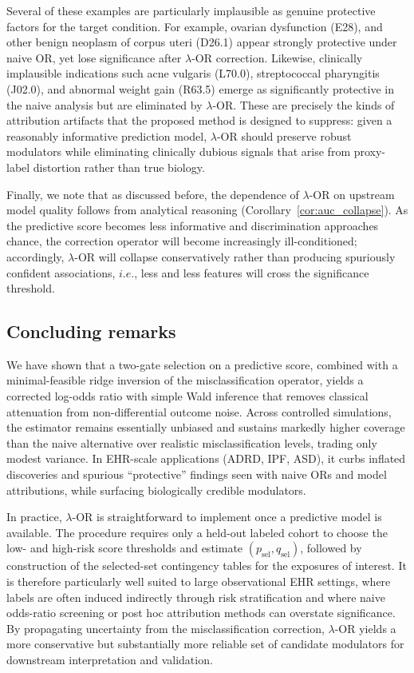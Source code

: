 \documentclass[pdflatex,sn-mathphys-num]{sn-jnl}%
\newcommand{\SPOR}{\textrm{$\lambda$-OR}}
\theoremstyle{thmstyleone}%
\theoremstyle{thmstyletwo}%
\theoremstyle{thmstylethree}%
\begin{document}
Several of these examples are particularly implausible as genuine protective factors for the target condition. For example,  ovarian dysfunction (E28), and other benign neoplasm of corpus uteri (D26.1) appear strongly protective under naive OR, yet lose significance after $\SPOR$ correction. Likewise, clinically implausible indications such  acne vulgaris (L70.0), streptococcal pharyngitis (J02.0), and abnormal weight gain (R63.5) emerge as significantly protective in the naive analysis but are eliminated  by $\SPOR$. These are precisely the kinds of attribution artifacts that the proposed method is designed to suppress: given a reasonably informative prediction model, $\SPOR$ should preserve robust modulators while eliminating clinically dubious signals that arise from proxy-label distortion rather than true biology.


Finally, we note that as discussed before, the dependence of $\SPOR$ on upstream model quality follows from  analytical reasoning (Corollary~\ref{cor:auc_collapse}). As the predictive score becomes less informative and discrimination approaches chance, the correction operator will become increasingly ill-conditioned; accordingly, $\SPOR$ will  collapse conservatively rather than producing spuriously confident associations, $i.e.$, less and less features will cross the significance threshold. 


\subsection*{Concluding remarks}
We have shown that a two-gate selection on a predictive score, combined with a minimal-feasible ridge inversion of the misclassification operator, yields a corrected log-odds ratio with simple Wald inference that removes classical attenuation from non-differential outcome noise. Across controlled simulations, the estimator remains essentially unbiased and sustains markedly higher coverage than the naive alternative over realistic misclassification levels, trading only modest variance. In EHR-scale applications (ADRD, IPF, ASD), it curbs inflated discoveries and spurious ``protective'' findings seen with naive ORs and model attributions, while surfacing biologically credible modulators.

In practice, $\SPOR$ is straightforward to implement once a predictive model is available. The procedure requires only a held-out labeled cohort to choose the low- and high-risk score thresholds and estimate \((p_{\mathrm{sel}},q_{\mathrm{sel}})\), followed by construction of the selected-set contingency tables for the exposures of interest. It is therefore particularly well suited to large observational EHR settings, where labels are often induced indirectly through risk stratification and where naive odds-ratio screening or post hoc attribution methods can overstate significance. By propagating uncertainty from the misclassification correction, $\SPOR$ yields a more conservative but substantially more reliable set of candidate modulators for downstream interpretation and validation.
\end{document}
